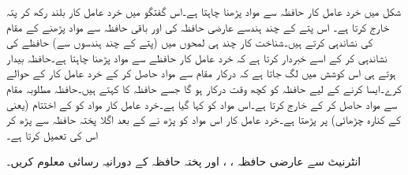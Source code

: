 شکل    میں خرد عامل کار حافظہ سے مواد پڑھنا چاہتا ہے۔اس گفتگو میں خرد عامل کار  بلند رکھ کر پتہ خارج کرتا ہے۔ اس  پتے کے چند ہندسے عارضی حافظہ کی اور باقی حافظہ سے مواد پڑھنے کے مقام کی نشاندہی کرتے ہیں۔شناخت کار چند ہی لمحوں میں (پتے کے چند ہندسوں سے) حافظے کی نشاندہی کر کے اسے خبردار کرتا ہے کہ خرد عامل کار حافظے سے مواد پڑھنا چاہتا ہے۔حافظہ بیدار ہوتے ہی اس کوشش میں لگ جاتا ہے کہ درکار مقام سے مواد حاصل کر کے خرد عامل کار کے حوالے کرے۔ایسا کرنے کے لیے حافظہ کو کچھ وقت درکار ہو گا جسے حافظہ کا  کہتے ہیں۔حافظہ مطلوبہ مقام سے مواد حاصل کر کے خارج کرتا ہے۔اس مواد کو  کہا گیا ہے۔خرد عامل کار مواد کو  کے اختتام  (یعنی  کے کنارہ چڑھائی)     پر پڑھتا ہے۔خرد عامل کار اس مواد کو پڑھ نے کے بعد  اگلا   پختہ حافظہ سے پڑھ کر   اس کی تعمیل کرتا ہے۔

انٹرنیٹ سے عارضی حافظہ  ، ،  اور پختہ حافظہ    کے دورانیہ رسائی معلوم  کریں۔

